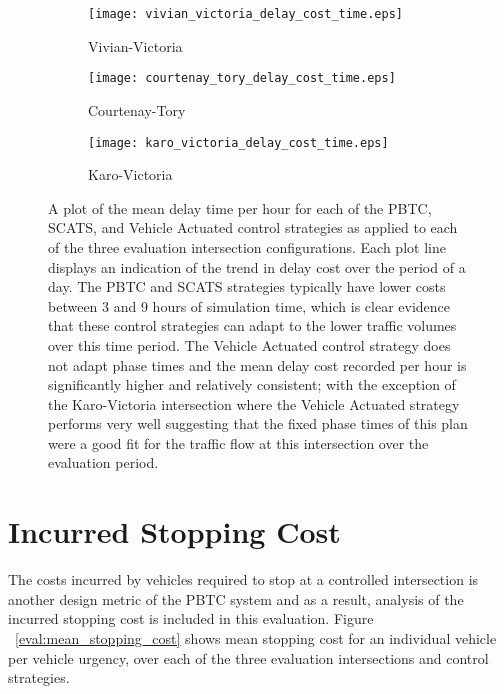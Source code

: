 \begin{figure}
\centering
\begin{subfigure}{.5\textwidth}
  \centering
  \texttt{[image: vivian\_victoria\_delay\_cost\_time.eps]}
  \caption{Vivian-Victoria}
  \label{delay_cost_time:sub1}
\end{subfigure}%
\begin{subfigure}{.5\textwidth}
  \centering
  \texttt{[image: courtenay\_tory\_delay\_cost\_time.eps]}
  \caption{Courtenay-Tory}
  \label{delay_cost_time:sub2}
\end{subfigure}

\vspace{1cm}

\begin{subfigure}{.5\textwidth}
  \centering
  \texttt{[image: karo\_victoria\_delay\_cost\_time.eps]}
  \caption{Karo-Victoria}
  \label{delay_cost_time:sub3}
\end{subfigure}%
\caption{ A plot of the mean delay time per hour for each of the PBTC, SCATS, and Vehicle Actuated control strategies as applied to each of the three evaluation intersection configurations. Each plot line displays an indication of the trend in delay cost over the period of a day. The PBTC and SCATS strategies typically have lower costs between 3 and 9 hours of simulation time, which is clear evidence that these control strategies can adapt to the lower traffic volumes over this time period. The Vehicle Actuated control strategy does not adapt phase times and the mean delay cost recorded per hour is significantly higher and relatively consistent; with the exception of the Karo-Victoria intersection where the Vehicle Actuated strategy performs very well suggesting that the fixed phase times of this plan were a good fit for the traffic flow at this intersection over the evaluation period. }
\label{eval:delay_cost_time}
\end{figure}

\section{Incurred Stopping Cost}
\label{sec:incurred_stopping_cost}

The costs incurred by vehicles required to stop at a controlled intersection is another design metric of the PBTC system and as a result, analysis of the incurred stopping cost is included in this evaluation. Figure ~\ref{eval:mean_stopping_cost} shows mean stopping cost for an individual vehicle per vehicle urgency, over each of the three evaluation intersections and control strategies. 

